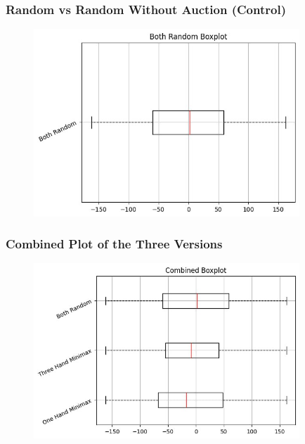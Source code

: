\documentclass{beamer}
\begin{document}
\begin{frame}\frametitle{Random vs Random Without Auction (Control)}
\begin{center}
        \begin{figure}
	    \includegraphics[width=10cm]{RandomvsRandom.png}
        \end{figure}
\end{center}
\end{frame}

\begin{frame}\frametitle{Combined Plot of the Three Versions}
\begin{center}
        \begin{figure}
	    \includegraphics[width=10cm]{Combined.png}
        \end{figure}
\end{center}
\end{frame}
\end{document}
